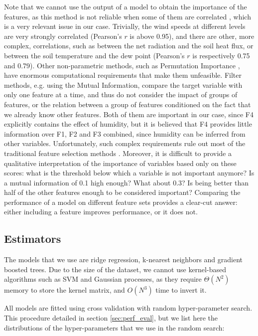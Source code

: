 \documentclass[a4paper,11pt]{kth-mag}
\begin{document}
Note that we cannot use the output of a model to obtain the importance of the features, as this method is not reliable when some of them are correlated \citep{rf_bias,rf_corr_imp}, which is a very relevant issue in our case. Trivially, the wind speeds at different levels are very strongly correlated (Pearson's $r$ is above 0.95), and there are other, more complex, correlations, such as between the net radiation and the soil heat flux, or between the soil temperature and the dew point (Pearson's $r$ is respectively 0.75 and 0.79). Other non-parametric methods, such as Permutation Importance \citep{permutation_importance}, have enormous computational requirements that make them unfeasible. Filter methods, e.g. using the Mutual Information, compare the target variable with only one feature at a time, and thus do not consider the impact of groups of features, or the relation between a group of features conditioned on the fact that we already know other features. Both of them are important in our case, since F4 explicitly contains the effect of humidity, but it is believed that F4 provides little information over F1, F2 and F3 combined, since humidity can be inferred from other variables. Unfortunately, such complex requirements rule out most of the traditional feature selection methods \citep{fsel}. Moreover, it is difficult to provide a qualitative interpretation of the importance of variables based only on these scores: what is the threshold below which a variable is not important anymore? Is a mutual information of 0.1 high enough? What about 0.3? Is being better than half of the other features enough to be considered important? Comparing the performance of a model on different feature sets provides a clear-cut answer: either including a feature improves performance, or it does not.


\subsection{Estimators}

The models that we use are ridge regression, k-nearest neighbors and gradient boosted trees. Due to the size of the dataset, we cannot use kernel-based algorithms such as SVM and Gaussian processes, as they require $\Theta(N^2)$ memory to store the kernel matrix, and $O(N^3)$ time to invert it.

All models are fitted using cross validation with random hyper-parameter search. This procedure detailed in section \ref{sec:perf_eval}, but we list here the distributions of the hyper-parameters that we use in the random search:
\end{document}
